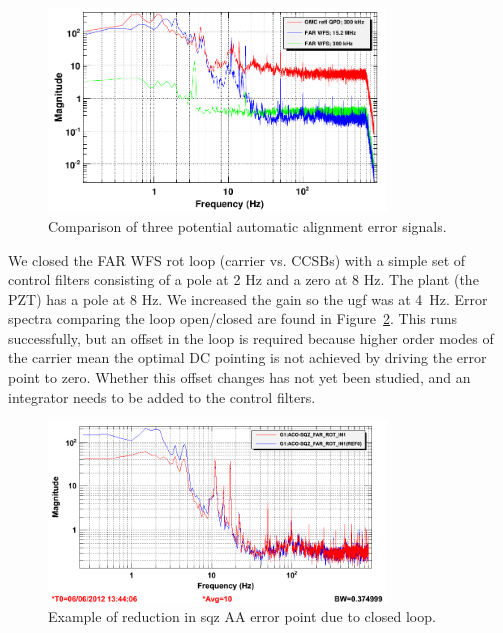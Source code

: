 \documentclass{ligodoc}
\begin{document}
\begin{figure}
\begin{centering}
\includegraphics[width=0.8\textwidth]{figures/sqzAA_compare.png}
\caption{Comparison of three potential automatic alignment error signals.}
\label{fig:AA}
\end{centering}
\end{figure}

We closed the FAR WFS rot loop (carrier vs. CCSBs) with a simple set
of control filters consisting of a pole at 2 Hz and a zero at 8
Hz. The plant (the PZT) has a pole at 8 Hz. We increased the gain so
the ugf was at 4~Hz. Error spectra comparing the loop open/closed are
found in Figure~\ref{fig:AAloopclosed}. This runs successfully, but an
offset in the loop is required because higher order modes of the
carrier mean the optimal DC pointing is not achieved by driving the
error point to zero. Whether this offset changes has not yet been
studied, and an integrator needs to be added to the control filters.

\begin{figure}
\begin{centering}
\includegraphics[width=0.8\textwidth]{figures/sqz_FARROT_demo.png}
\caption{Example of reduction in sqz AA error point due to closed loop.}
\label{fig:AAloopclosed}
\end{centering}
\end{figure}
\end{document}
